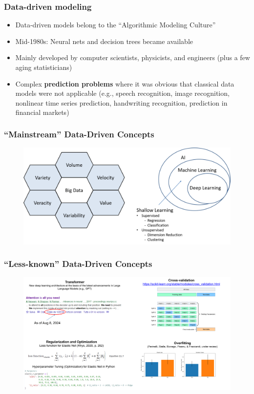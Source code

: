 \documentclass{beamer}
\begin{document}
\begin{frame}
	\frametitle{Data-driven modeling}
	\begin{itemize}
		\item Data-driven models belong to the ``Algorithmic Modeling Culture''
		\item Mid-1980s: Neural nets and decision trees became available
		\item Mainly developed by computer scientists, physicists, and engineers (plus a few aging statisticians)
		\item Complex \textbf{prediction problems} where it was obvious that classical data models were not applicable {\scriptsize (e.g., speech recognition, image recognition, nonlinear time series prediction, handwriting recognition, prediction in financial markets)}
	\end{itemize}
	
	\begin{flushright}
		\textit{\parencite[205]{breiman2001}}
	\end{flushright}
\end{frame}


\begin{frame}
	\frametitle{``Mainstream'' Data-Driven Concepts}
	\begin{figure}
		\centering
		\includegraphics[width=1\linewidth]{figs/BigData_AI.png}
	\end{figure}
\end{frame}

\begin{frame}
	\frametitle{``Less-known'' Data-Driven Concepts}
	\begin{figure}
		\centering
		\includegraphics[width=1\linewidth]{figs/BigData_AI_LessKnown.png}
	\end{figure}
\end{frame}
\end{document}
